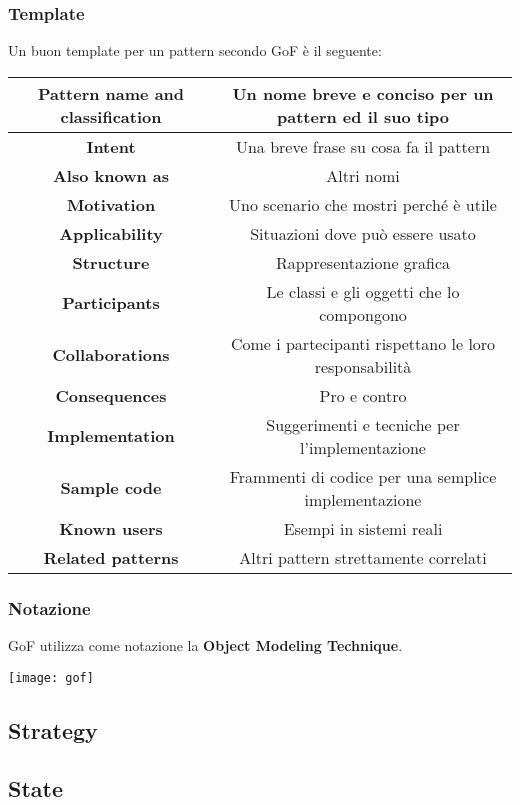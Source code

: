 \newpage
\subsubsection{Template}
Un buon template per un pattern secondo GoF è il seguente:
\begin{table}[!h]
	\centering
	\begin{tabular}{|c|c|}
		\hline
		\textbf{Pattern name and classification} & Un nome breve e conciso per un pattern ed il suo tipo \\
		\hline
		\textbf{Intent} & Una breve frase su cosa fa il pattern \\
		\hline
		\textbf{Also known as} & Altri nomi \\
		\hline
		\textbf{Motivation} & Uno scenario che mostri perché è utile \\
		\hline
		\textbf{Applicability} & Situazioni dove può essere usato \\
		\hline
		\textbf{Structure} & Rappresentazione grafica \\
		\hline
		\textbf{Participants} & Le classi e gli oggetti che lo compongono\\
		\hline
		\textbf{Collaborations} & Come i partecipanti rispettano le loro responsabilità \\
		\hline
		\textbf{Consequences} & Pro e contro \\
		\hline
		\textbf{Implementation} & Suggerimenti e tecniche per l'implementazione \\
		\hline
		\textbf{Sample code} & Frammenti di codice per una semplice implementazione \\
		\hline
		\textbf{Known users} & Esempi in sistemi reali \\
		\hline
		\textbf{Related patterns} & Altri pattern strettamente correlati \\
		\hline
	\end{tabular}
\end{table}

\subsubsection{Notazione}
GoF utilizza come notazione la \textbf{Object Modeling Technique}.
\begin{center}
	\texttt{[image: gof]}
\end{center}

\subsection{Strategy}
\subsection{State}